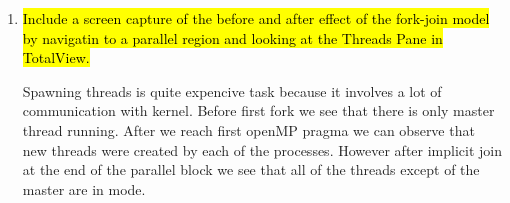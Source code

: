 \documentclass{article}
\begin{document}
\begin{enumerate}
	\item \hl{Include a screen capture of the before and after effect of the fork-join model by navigatin to a parallel region and looking at the Threads Pane in TotalView.} ~
	
	 Spawning threads is quite expencive task because it involves a lot of 
	communication with kernel. Before first fork we see that there is only master thread running.
	After we reach first openMP pragma we can observe that new threads were created by each of the 
	processes. However after implicit join at the end of the parallel block we see that all of the
	threads except of the master are in  mode.

\end{enumerate}
\end{document}

